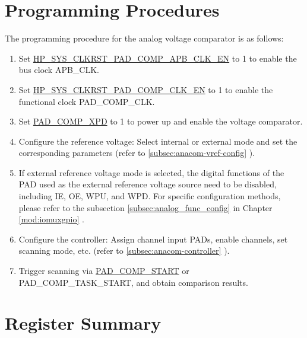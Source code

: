 \documentclass[main\_\_EN.tex]{subfiles}
\begin{document}

\section{Programming Procedures}
\label{sec:anacom-prog-procedures}

The programming procedure for the analog voltage comparator is as follows:


\begin{enumerate}
    \item Set \hyperref[fielddesc:HPSYSCLKRSTPADCOMPAPBCLKEN]{HP\_SYS\_CLKRST\_PAD\_COMP\_APB\_CLK\_EN} to 1 to enable the bus clock APB\_CLK.
    \item Set \hyperref[fielddesc:HPSYSCLKRSTPADCOMPCLKEN]{HP\_SYS\_CLKRST\_PAD\_COMP\_CLK\_EN} to 1 to enable the functional clock PAD\_COMP\_CLK.
    \item Set \hyperref[fielddesc:PADCOMPXPD]{PAD\_COMP\_XPD} to 1 to power up and enable the voltage comparator.
    \item Configure the reference voltage: Select internal or external mode and set the corresponding parameters (refer to \ref{subsec:anacom-vref-config} \textit{}).
    \item If external reference voltage mode is selected, the digital functions of the PAD used as the external reference voltage source need to be disabled, including IE, OE, WPU, and WPD. For specific configuration methods, please refer to the subsection \ref{subsec:analog_func_config} \textit{}  in Chapter \ref{mod:iomuxgpio} \textit{}.
    \item Configure the controller: Assign channel input PADs, enable channels, set scanning mode, etc. (refer to \ref{subsec:anacom-controller} \textit{}).
    \item Trigger scanning via \hyperref[fielddesc:PADCOMPSTART]{PAD\_COMP\_START} or PAD\_COMP\_TASK\_START, and obtain comparison results.
\end{enumerate}



\newpage
\hypertarget{anacom-reg-summ}{}
\section{Register Summary}
\label{sec:anacom-reg-summ}
\end{document}
